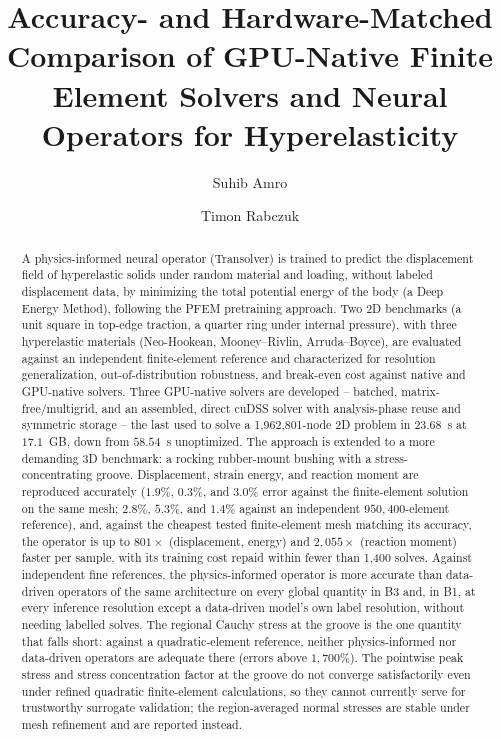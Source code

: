 \documentclass[final,5p,times]{elsarticle}
\begin{document}
\begin{frontmatter}

\title{Accuracy- and Hardware-Matched Comparison of GPU-Native Finite Element Solvers and Neural Operators for Hyperelasticity}

\author[rub]{Suhib Amro}
\author[rub,fudan]{Timon Rabczuk}
\address[rub]{Chair of Computational Mechanics, Bauhaus-Universit\"at Weimar}
\address[fudan]{Institute of CMxAI, Fudan University, Shanghai, China}

\begin{abstract}
A physics-informed neural operator (Transolver) is trained to predict the
displacement field of hyperelastic solids under random material and
loading, without labeled displacement data, by minimizing the total
potential energy of the body (a Deep Energy Method), following the PFEM
pretraining approach. Two 2D benchmarks (a unit square in top-edge
traction, a quarter ring under internal pressure), with three hyperelastic
materials (Neo-Hookean, Mooney--Rivlin, Arruda--Boyce), are evaluated
against an independent finite-element reference and characterized for
resolution generalization, out-of-distribution robustness, and break-even
cost against native and GPU-native solvers. Three GPU-native solvers are
developed -- batched, matrix-free/multigrid, and an assembled, direct
cuDSS solver with analysis-phase reuse and symmetric storage -- the last
used to solve a 1,962,801-node 2D problem in $23.68$~s at $17.1$~GB, down
from $58.54$~s unoptimized. The approach is extended to a more demanding
3D benchmark: a rocking rubber-mount bushing with a stress-concentrating
groove. Displacement, strain energy, and reaction moment are reproduced
accurately ($1.9\%$, $0.3\%$, and $3.0\%$ error against the
finite-element solution on the same mesh; $2.8\%$, $5.3\%$, and $1.4\%$
against an independent $950{,}400$-element reference), and, against the
cheapest tested finite-element mesh matching its accuracy, the operator
is up to $801\times$ (displacement, energy) and $2{,}055\times$
(reaction moment) faster per sample, with its training cost repaid
within fewer than 1{,}400 solves. Against independent fine references, the
physics-informed operator is more accurate than data-driven operators of
the same architecture on every global quantity in B3 and, in B1, at
every inference resolution except a data-driven model's own label
resolution, without needing labelled solves. The regional Cauchy stress at the groove is the
one quantity that falls short: against a quadratic-element reference,
neither physics-informed nor data-driven operators are adequate there
(errors above $1{,}700\%$). The pointwise peak stress and stress
concentration factor at the groove do not converge satisfactorily even
under refined quadratic finite-element calculations, so they cannot
currently serve for trustworthy surrogate validation; the
region-averaged normal stresses are stable under mesh refinement and are
reported instead.
\end{abstract}


\end{frontmatter}
\end{document}

